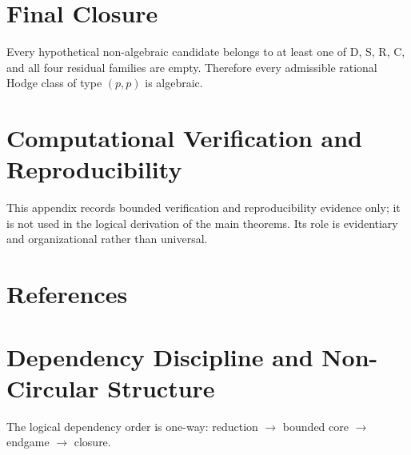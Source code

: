 \documentclass[11pt,a4paper]{article}
\begin{document}
\section{Final Closure}
Every hypothetical non-algebraic candidate belongs to at least one of D, S, R, C, and all four residual families are empty. Therefore every admissible rational Hodge class of type \((p,p)\) is algebraic.

\appendix
\section{Computational Verification and Reproducibility}
This appendix records bounded verification and reproducibility evidence only; it is not used in the logical derivation of the main theorems. Its role is evidentiary and organizational rather than universal.

\section{References}

\section{Dependency Discipline and Non-Circular Structure}
The logical dependency order is one-way: reduction \(\to\) bounded core \(\to\) endgame \(\to\) closure.

\end{document}
